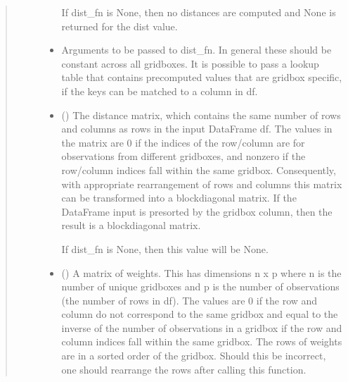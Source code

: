 \documentclass[letterpaper,10pt,english]{sphinxmanual}
\begin{document}
\begin{fulllineitems}
\begin{quote}
\begin{description}
\begin{itemize}
\sphinxAtStartPar
If dist\_fn is None, then no distances are computed and None is returned
for the dist value.


\item {}
\sphinxAtStartPar
{} \textendash{} Arguments to be passed to dist\_fn. In general these should be constant
across all gridboxes. It is possible to pass a look\sphinxhyphen{}up table that
contains pre\sphinxhyphen{}computed values that are gridbox specific, if the keys can
be matched to a column in df.

\end{itemize}

\sphinxAtStartPar
{}

\sphinxAtStartPar
\begin{itemize}
\item {}
\sphinxAtStartPar
{} () \textendash{} The distance matrix, which contains the same number of rows and columns
as rows in the input DataFrame df. The values in the matrix are 0 if the
indices of the row/column are for observations from different gridboxes,
and non\sphinxhyphen{}zero if the row/column indices fall within the same gridbox.
Consequently, with appropriate re\sphinxhyphen{}arrangement of rows and columns this
matrix can be transformed into a block\sphinxhyphen{}diagonal matrix. If the DataFrame
input is pre\sphinxhyphen{}sorted by the gridbox column, then the result is a
block\sphinxhyphen{}diagonal matrix.

\sphinxAtStartPar
If dist\_fn is None, then this value will be None.

\item {}
\sphinxAtStartPar
{} () \textendash{} A matrix of weights. This has dimensions n x p where n is the number of
unique gridboxes and p is the number of observations (the number of rows
in df). The values are 0 if the row and column do not correspond to the
same gridbox and equal to the inverse of the number of observations in a
gridbox if the row and column indices fall within the same gridbox. The
rows of weights are in a sorted order of the gridbox. Should this be
incorrect, one should re\sphinxhyphen{}arrange the rows after calling this function.

\end{itemize}


\end{description}\end{quote}

\end{fulllineitems}
\end{document}
